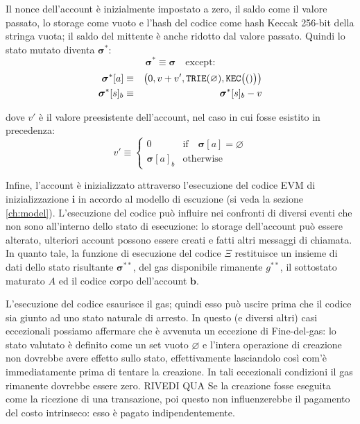 \documentclass[9pt,oneside]{amsart}
\begin{document}
\begin{multicols}{2}
Il nonce dell'account è inizialmente impostato a zero, il saldo come il valore passato, lo storage come vuoto e l'hash del codice come hash Keccak 256-bit della stringa vuota; il saldo del mittente è anche ridotto dal valore passato. Quindi lo stato mutato diventa $\boldsymbol{\sigma}^*$:
\begin{equation}
\boldsymbol{\sigma}^* \equiv \boldsymbol{\sigma} \quad \text{except:}
\end{equation}
\begin{eqnarray}
\boldsymbol{\sigma}^*[a] &\equiv& \big( 0, v + v', \mathtt{\tiny TRIE}(\varnothing), \mathtt{\tiny KEC}\big(()\big) \big) \\
\boldsymbol{\sigma}^*[s]_b &\equiv& \boldsymbol{\sigma}^*[s]_b - v
\end{eqnarray}

dove $v'$ è il valore preesistente dell'account, nel caso in cui fosse esistito in precedenza:
\begin{equation}
v' \equiv \begin{cases}
0 & \text{if} \quad \boldsymbol{\sigma}[a] = \varnothing\\
\boldsymbol{\sigma}[a]_b & \text{otherwise}
\end{cases}
\end{equation}


Infine, l'account è inizializzato attraverso l'esecuzione del codice EVM di inizializzazione $\mathbf{i}$ in accordo al modello di escuzione (si veda la sezione \ref{ch:model}). L'esecuzione del codice può influire nei confronti di diversi eventi che non sono all'interno dello stato di esecuzione: lo storage dell'account può essere alterato, ulteriori account possono essere creati e fatti altri messaggi di chiamata. In quanto tale, la funzione di esecuzione del codice $\Xi$ restituisce un insieme di dati dello stato risultante $\boldsymbol{\sigma}^{**}$, del gas disponibile rimanente $g^{**}$, il sottostato maturato $A$ ed il codice corpo dell'account $\mathbf{b}$.

L'esecuzione del codice esaurisce il gas; quindi esso può uscire prima che il codice sia giunto ad uno stato naturale di arresto. In questo (e diversi altri) casi eccezionali possiamo affermare che è avvenuta un eccezione di Fine-del-gas: lo stato valutato è definito come un set vuoto $\varnothing$ e l'intera operazione di creazione non dovrebbe avere effetto sullo stato, effettivamente lasciandolo così com'è immediatamente prima di tentare la creazione. In tali eccezionali condizioni il gas rimanente dovrebbe essere zero. RIVEDI QUA Se la creazione fosse eseguita come la ricezione di una transazione, poi questo non influenzerebbe il pagamento del costo intrinseco: esso è pagato indipendentemente.


\end{multicols}
\end{document}
